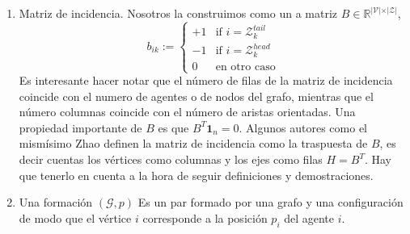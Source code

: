 \documentclass[10pt,a4paper]{article}
\begin{document}
\begin{enumerate}
\item Matriz de incidencia. Nosotros la construimos como un a matriz $B \in \mathbb{R}^{\vert \mathcal{V} \vert \times \vert \mathcal{Z}\vert}$,
\begin{equation}
b_{ik}:= \left\{ \begin{array}{ll}
+1 & \text{if } i =\mathcal{Z}_k^{tail}\\
-1 & \text{if } i = \mathcal{Z}_k^{head}\\
0  & \text{en otro caso} 
\end{array} \right.
\end{equation} 
Es interesante hacer notar que el número de filas de la matriz de incidencia coincide con el numero de agentes o de nodos del grafo, mientras que el número columnas coincide con el número de aristas orientadas. Una propiedad importante de $B$ es que $B^T\mathbf{1}_n =0$. Algunos autores como el mismísimo Zhao definen la matriz de incidencia como la traspuesta de $B$, es decir cuentas los vértices como columnas y los ejes como filas $H=B^T$. Hay que tenerlo en cuenta a la hora de seguir definiciones y demostraciones.

\item Una formación $(\mathcal{G},p)$ Es un par formado por una grafo y una configuración de modo que el vértice $i$ corresponde a la posición $p_i$ del agente $i$.


  
\end{enumerate}




\end{document}
